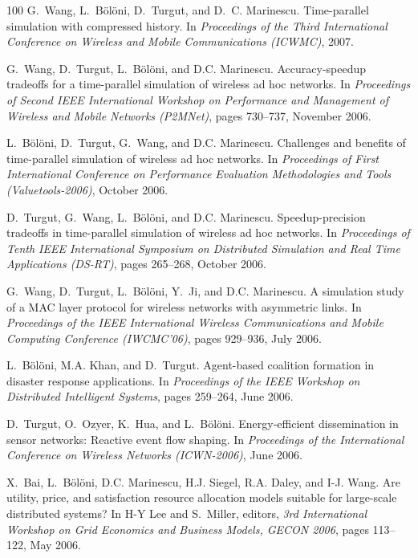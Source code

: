 \begin{thebibliography}{100}
G.~Wang, L.~Bölöni, D.~Turgut, and D.~C. Marinescu.
\newblock Time-parallel simulation with compressed history.
\newblock In {\em Proceedings of the Third International Conference on Wireless
  and Mobile Communications (ICWMC)}, 2007.

G.~Wang, D.~Turgut, L.~Bölöni, and D.C. Marinescu.
\newblock Accuracy-speedup tradeoffs for a time-parallel simulation of wireless
  ad hoc networks.
\newblock In {\em Proceedings of Second IEEE International Workshop on
  Performance and Management of Wireless and Mobile Networks (P2MNet)}, pages
  730--737, November 2006.

L.~Bölöni, D.~Turgut, G.~Wang, and D.C. Marinescu.
\newblock Challenges and benefits of time-parallel simulation of wireless ad
  hoc networks.
\newblock In {\em Proceedings of First International Conference on Performance
  Evaluation Methodologies and Tools (Valuetools-2006)}, October 2006.

D.~Turgut, G.~Wang, L.~Bölöni, and D.C. Marinescu.
\newblock Speedup-precision tradeoffs in time-parallel simulation of wireless
  ad hoc networks.
\newblock In {\em Proceedings of Tenth IEEE International Symposium on
  Distributed Simulation and Real Time Applications (DS-RT)}, pages 265--268,
  October 2006.

G.~Wang, D.~Turgut, L.~Bölöni, Y.~Ji, and D.C. Marinescu.
\newblock A simulation study of a {MAC} layer protocol for wireless networks
  with asymmetric links.
\newblock In {\em Proceedings of the IEEE International Wireless Communications
  and Mobile Computing Conference (IWCMC'06)}, pages 929--936, July 2006.

L.~Bölöni, M.A. Khan, and D.~Turgut.
\newblock Agent-based coalition formation in disaster response applications.
\newblock In {\em Proceedings of the IEEE Workshop on Distributed Intelligent
  Systems}, pages 259--264, June 2006.

D.~Turgut, O.~Ozyer, K.~Hua, and L.~Bölöni.
\newblock Energy-efficient dissemination in sensor networks: Reactive event
  flow shaping.
\newblock In {\em Proceedings of the International Conference on Wireless
  Networks (ICWN-2006)}, June 2006.

X.~Bai, L.~Bölöni, D.C. Marinescu, H.J. Siegel, R.A. Daley, and I-J. Wang.
\newblock Are utility, price, and satisfaction resource allocation models
  suitable for large-scale distributed systems?
\newblock In H-Y Lee and S.~Miller, editors, {\em 3rd International Workshop on
  Grid Economics and Business Models, GECON 2006}, pages 113--122, May 2006.


\end{thebibliography}
